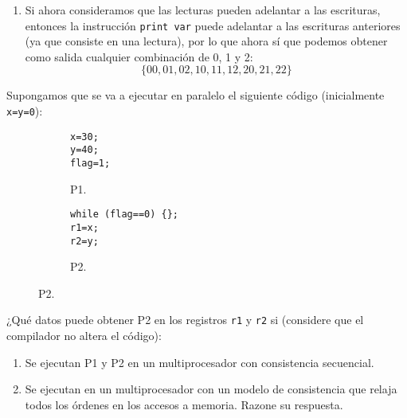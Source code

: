 \begin{ejercicio}
\begin{enumerate}
        \item Si ahora consideramos que las lecturas pueden adelantar a las escrituras, entonces la instrucción \verb|print var| puede adelantar a las escrituras anteriores (ya que consiste en una lectura), por lo que ahora sí que podemos obtener como salida cualquier combinación de 0, 1 y 2:
            \begin{equation*}
                \{0 0, 0 1, 0 2, 1 0, 1 1, 1 2, 2 0, 2 1, 2 2\}
            \end{equation*}
    \end{enumerate}

\end{ejercicio}


\begin{ejercicio}
    Supongamos que se va a ejecutar en paralelo el siguiente código (inicialmente \verb|x=y=0|):
    \begin{figure}[H]
        \centering
        \begin{subfigure}{0.3\textwidth}
            \begin{verbatim}
x=30;
y=40;
flag=1;
            \end{verbatim}
            \caption{P1.}
        \end{subfigure}\hspace{3cm}
        \begin{subfigure}{0.3\textwidth}
            \begin{verbatim}
while (flag==0) {};
r1=x;
r2=y;
            \end{verbatim}
            \caption{P2.}            
        \end{subfigure}
    \end{figure}

    ¿Qué datos puede obtener P2 en los registros \verb|r1| y \verb|r2| si (considere que el compilador no altera el código):
    \begin{enumerate}
        \item Se ejecutan P1 y P2 en un multiprocesador con consistencia secuencial.
        \item Se ejecutan en un multiprocesador con un modelo de consistencia que relaja todos los órdenes en los accesos a memoria. Razone su respuesta.
    \end{enumerate}


\end{ejercicio}
